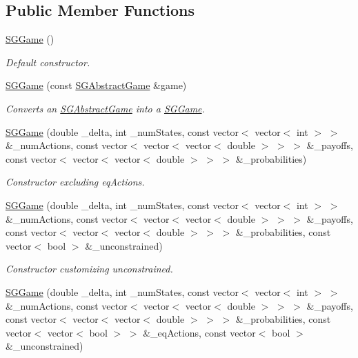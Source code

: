 \subsection*{Public Member Functions}
\begin{DoxyCompactItemize}
\item 
\mbox{\label{classSGGame_a935fc76700c675f842dc1666ffe2e8f7}} 
\hyperlink{classSGGame_a935fc76700c675f842dc1666ffe2e8f7}{S\+G\+Game} ()
\begin{DoxyCompactList}\small\item\em Default constructor. \end{DoxyCompactList}\item 
\hyperlink{classSGGame_a0b85bb1b3a04539bef72dadc7e170b2f}{S\+G\+Game} (const \hyperlink{classSGAbstractGame}{S\+G\+Abstract\+Game} \&game)
\begin{DoxyCompactList}\small\item\em Converts an \hyperlink{classSGAbstractGame}{S\+G\+Abstract\+Game} into a \hyperlink{classSGGame}{S\+G\+Game}. \end{DoxyCompactList}\item 
\hyperlink{classSGGame_ad881fb3f3db38d4b7c2ea0beb7181fc0}{S\+G\+Game} (double \+\_\+delta, int \+\_\+num\+States, const vector$<$ vector$<$ int $>$ $>$ \&\+\_\+num\+Actions, const vector$<$ vector$<$ vector$<$ double $>$ $>$ $>$ \&\+\_\+payoffs, const vector$<$ vector$<$ vector$<$ double $>$ $>$ $>$ \&\+\_\+probabilities)
\begin{DoxyCompactList}\small\item\em Constructor excluding eq\+Actions. \end{DoxyCompactList}\item 
\mbox{\label{classSGGame_ad4d48551202bda3c56f8860a24f04260}} 
\hyperlink{classSGGame_ad4d48551202bda3c56f8860a24f04260}{S\+G\+Game} (double \+\_\+delta, int \+\_\+num\+States, const vector$<$ vector$<$ int $>$ $>$ \&\+\_\+num\+Actions, const vector$<$ vector$<$ vector$<$ double $>$ $>$ $>$ \&\+\_\+payoffs, const vector$<$ vector$<$ vector$<$ double $>$ $>$ $>$ \&\+\_\+probabilities, const vector$<$ bool $>$ \&\+\_\+unconstrained)
\begin{DoxyCompactList}\small\item\em Constructor customizing unconstrained. \end{DoxyCompactList}\item 
\hyperlink{classSGGame_abf23f0bd27cc79e44bdae273ef8a7735}{S\+G\+Game} (double \+\_\+delta, int \+\_\+num\+States, const vector$<$ vector$<$ int $>$ $>$ \&\+\_\+num\+Actions, const vector$<$ vector$<$ vector$<$ double $>$ $>$ $>$ \&\+\_\+payoffs, const vector$<$ vector$<$ vector$<$ double $>$ $>$ $>$ \&\+\_\+probabilities, const vector$<$ vector$<$ bool $>$ $>$ \&\+\_\+eq\+Actions, const vector$<$ bool $>$ \&\+\_\+unconstrained)

\end{DoxyCompactItemize}
